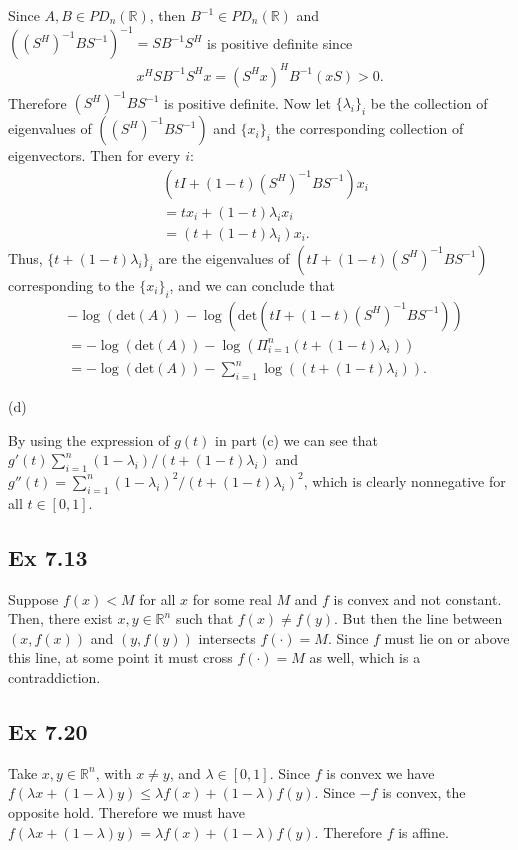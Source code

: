 \documentclass[letterpaper,12pt]{article}
\theoremstyle{definition}
\begin{document}
\begin{spacing}{1.3}{}
	Since $A,B\in PD_n(\mathbb R)$, then $B^{-1}\in PD_n(\mathbb R)$ and
	$((S^H)^{-1}BS^{-1})^{-1} = SB^{-1}S^H$ is positive definite since
	\begin{align*}
	x^HSB^{-1}S^Hx=
	(S^Hx)^HB^{-1}(xS)>0.
	\end{align*}
	Therefore $(S^H)^{-1}BS^{-1}$ is positive definite.
	Now let $\{\lambda_i\}_i$ be the collection of eigenvalues of $((S^H)^{-1}BS^{-1})$
	and $\{x_i\}_i$ the corresponding collection of eigenvectors. Then for every $i$:
	\begin{align*}
	&(tI+(1-t)(S^H)^{-1}BS^{-1})x_i\\
	&=tx_i + (1-t)\lambda_ix_i\\
	&=(t+(1-t)\lambda_i)x_i.
	\end{align*}
	Thus, $\{t + (1-t)\lambda_i\}_i$ are the eigenvalues of $(tI+(1-t)(S^H)^{-1}BS^{-1})$ 
	corresponding to the $\{x_i\}_i$, and we can conclude that
	\begin{align*}
	&-\log(\text{det}(A))- \log(\text{det}(tI+(1-t)(S^H)^{-1}BS^{-1}))\\
	&=-\log(\text{det}(A))- \log(\Pi_{i=1}^n(t + (1-t)\lambda_i))\\
	&=-\log(\text{det}(A))- \sum_{i=1}^n\log((t + (1-t)\lambda_i)).
	\end{align*}
	
	(d)
	
	By using the expression of $g(t)$ in part (c) we can see that
	$g'(t)\sum_{i=1}^n(1-\lambda_i)/(t+(1-t)\lambda_i)$ and
	$g''(t)=\sum_{i=1}^n(1-\lambda_i)^2/(t+(1-t)\lambda_i)^2$, 
	which is clearly nonnegative for all $t\in[0,1]$.
	
	\subsection*{Ex 7.13}
	Suppose $f(x)<M$ for all $x$ for some real $M$ and $f$ is convex and not constant. 
	Then, there exist $x,y\in\mathbb R^n$ such that $f(x)\neq f(y)$.
	But then the line between $(x,f(x))$ and $(y,f(y))$ intersects $f(\cdot)=M$.
	Since $f$ must lie on or above this line, at some point it must cross $f(\cdot)=M$ as well, which is a contraddiction.
	
	\subsection*{Ex 7.20}
	Take $x,y\in\mathbb R^n$, with $x\neq y$, and $\lambda\in[0,1]$.
	Since $f$ is convex we have $f(\lambda x+(1-\lambda)y)\leq\lambda f(x)+(1-\lambda)f(y)$.
	Since $-f$ is convex, the opposite hold.
	Therefore we must have $f(\lambda x+(1-\lambda) y) = \lambda f(x)+(1-\lambda)f(y)$.
	Therefore $f$ is affine.
	

\end{spacing}
\end{document}
